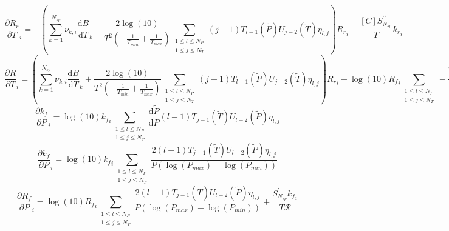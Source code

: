 \documentclass[a4paper,10pt]{article}
\newcommand{\ns}{N_{sp}}
\newcommand{\Ru}{\mathcal{R}}
\begin{document}
\begin{dmath} \frac{\partial {R_r} }{\partial T }_{i} = - \left(\sum_{k=1}^{\ns} \nu_{k,i} \frac{\text{d} B }{\text{d} T }_{k} + \frac{2 \log{\left (10 \right )}}{T^{2} \left(- \frac{1}{T_{min}} + \frac{1}{T_{max}}\right)} \sum_{\substack{1 \leq l \leq N_{P}\\1 \leq j \leq N_{T}}} \left(j - 1\right) T_{l - 1}\left(\tilde{P}\right) U_{j - 2}\left(\tilde{T}\right) \eta_{l,j}\right) {R_r}_{i} - \frac{[C] S^{\prime\prime}_{\ns}}{T} {k_r}_{i}\end{dmath} 
\begin{dmath} \frac{\partial R }{\partial T }_{i} = \left(\sum_{k=1}^{\ns} \nu_{k,i} \frac{\text{d} B }{\text{d} T }_{k} + \frac{2 \log{\left (10 \right )}}{T^{2} \left(- \frac{1}{T_{min}} + \frac{1}{T_{max}}\right)} \sum_{\substack{1 \leq l \leq N_{P}\\1 \leq j \leq N_{T}}} \left(j - 1\right) T_{l - 1}\left(\tilde{P}\right) U_{j - 2}\left(\tilde{T}\right) \eta_{l,j}\right) {R_r}_{i} + \log{\left (10 \right )} {R_f}_{i} \sum_{\substack{1 \leq l \leq N_{P}\\1 \leq j \leq N_{T}}} - \frac{2 T_{l - 1}\left(\tilde{P}\right) U_{j - 2}\left(\tilde{T}\right) \eta_{l,j}}{T^{2} \left(- \frac{1}{T_{min}} + \frac{1}{T_{max}}\right)} \left(j - 1\right) + \frac{[C]}{T} \left(S^{\prime\prime}_{\ns} {k_r}_{i} - S^{\prime}_{\ns} {k_f}_{i}\right)\end{dmath} 
\begin{dmath} \frac{\partial {k_f} }{\partial P }_{i} = \log{\left (10 \right )} {k_f}_{i} \sum_{\substack{1 \leq l \leq N_{P}\\1 \leq j \leq N_{T}}} \frac{\text{d} \tilde{P} }{\text{d} P } \left(l - 1\right) T_{j - 1}\left(\tilde{T}\right) U_{l - 2}\left(\tilde{P}\right) \eta_{l,j}\end{dmath} 
\begin{dmath} \frac{\partial {k_f} }{\partial P }_{i} = \log{\left (10 \right )} {k_f}_{i} \sum_{\substack{1 \leq l \leq N_{P}\\1 \leq j \leq N_{T}}} \frac{2 \left(l - 1\right) T_{j - 1}\left(\tilde{T}\right) U_{l - 2}\left(\tilde{P}\right) \eta_{l,j}}{P \left(\log{\left (P_{max} \right )} - \log{\left (P_{min} \right )}\right)}\end{dmath} 
\begin{dmath} \frac{\partial {R_f} }{\partial P }_{i} = \log{\left (10 \right )} {R_f}_{i} \sum_{\substack{1 \leq l \leq N_{P}\\1 \leq j \leq N_{T}}} \frac{2 \left(l - 1\right) T_{j - 1}\left(\tilde{T}\right) U_{l - 2}\left(\tilde{P}\right) \eta_{l,j}}{P \left(\log{\left (P_{max} \right )} - \log{\left (P_{min} \right )}\right)} + \frac{S^{\prime}_{\ns} {k_f}_{i}}{T \Ru}\end{dmath} 
\end{document}
